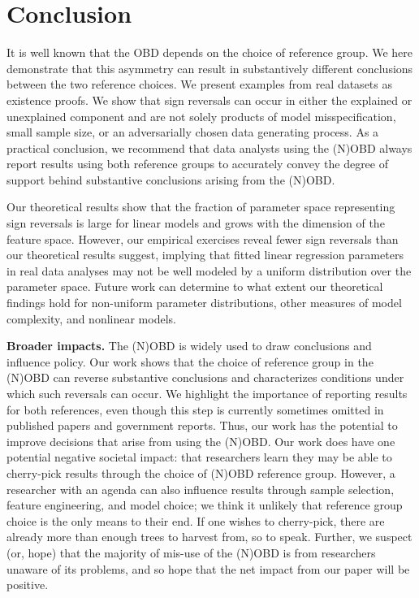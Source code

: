 \section{Conclusion}
\label{sec:conclusion}

It is well known that the OBD depends on the choice of reference group. 
We here demonstrate that this asymmetry can result in substantively different conclusions between the two reference choices.
We present examples from real datasets as existence proofs. 
We show that sign reversals can occur in either the explained or unexplained component and are not solely products of model misspecification, small sample size, or an adversarially chosen data generating process. 
As a practical conclusion, we recommend that data analysts using the (N)OBD always report results using both reference groups to accurately convey the degree of support behind substantive conclusions arising from the (N)OBD.

Our theoretical results show that the fraction of parameter space representing sign reversals is large for linear models and grows with the dimension of the feature space.
However, our empirical exercises reveal fewer sign reversals than our theoretical results suggest, implying that fitted linear regression parameters in real data analyses may not be well modeled by a uniform distribution over the parameter space. 
Future work can determine to what extent our theoretical findings hold for non-uniform parameter distributions, other measures of model complexity, and nonlinear models. 

\textbf{Broader impacts.}
The (N)OBD is widely used to draw conclusions and influence policy.
Our work shows that the choice of reference group in the (N)OBD can reverse substantive conclusions and characterizes conditions under which such reversals can occur.
We highlight the importance of reporting results for both references, even though this step is currently sometimes omitted in published papers
and government reports.
Thus, our work has the potential to improve decisions that arise from using the (N)OBD.
Our work does have one potential negative societal impact: that researchers learn they may be able to cherry-pick results through the choice of (N)OBD reference group.
However, a researcher with an agenda can also influence results through sample selection, feature engineering, and model choice; we think it unlikely that reference group choice is the only means to their end.
If one wishes to cherry-pick, there are already more than enough trees to harvest from, so to speak.
Further, we suspect (or, hope) that the majority of mis-use of the (N)OBD is from researchers unaware of its problems, and so hope that the net impact from our paper will be positive. 


